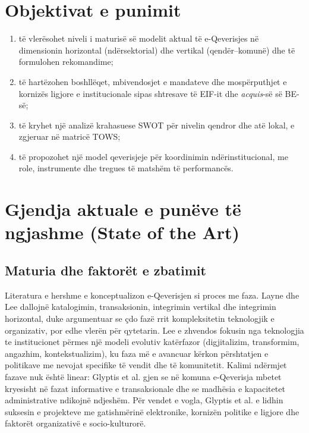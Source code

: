 \documentclass[conference]{IEEEtran}
\begin{document}
\section{Objektivat e punimit}
\label{sec:objektivat}
\begin{enumerate}
\renewcommand{\labelenumi}{O\arabic{enumi}:}
\item të vlerësohet niveli i maturisë së modelit aktual të e-Qeverisjes në
dimensionin horizontal (ndërsektorial) dhe vertikal (qendër--komunë) dhe të
formulohen rekomandime;
\item të hartëzohen boshllëqet, mbivendosjet e mandateve dhe mospërputhjet e
kornizës ligjore e institucionale sipas shtresave të EIF-it dhe
\textit{acquis}-së së BE-së;
\item të kryhet një analizë krahasuese SWOT për nivelin qendror dhe atë
lokal, e zgjeruar në matricë TOWS;
\item të propozohet një model qeverisjeje për koordinimin ndërinstitucional,
me role, instrumente dhe tregues të matshëm të performancës.
\end{enumerate}
\section{Gjendja aktuale e punëve të ngjashme (State of the Art)}
\label{sec:sota}
\subsection{Maturia dhe faktorët e zbatimit}
Literatura e hershme e konceptualizon e-Qeverisjen si proces me faza. Layne
dhe Lee \cite{layne2001} dallojnë katalogimin, transaksionin, integrimin
vertikal dhe integrimin horizontal, duke argumentuar se çdo fazë rrit
kompleksitetin teknologjik e organizativ, por edhe vlerën për qytetarin.
Lee e zhvendos fokusin nga teknologjia te
institucionet përmes një modeli evolutiv katërfazor (digjitalizim,
transformim, angazhim, kontekstualizim), ku faza më e avancuar kërkon
përshtatjen e politikave me nevojat specifike të vendit dhe të komunitetit.
Kalimi ndërmjet fazave nuk është linear: Glyptis et al. gjen se në
komuna e-Qeverisja mbetet kryesisht në fazat informative e transaksionale
dhe se madhësia e kapacitetet administrative ndikojnë ndjeshëm. Për vendet
e vogla, Glyptis et al. \cite{glyptis2020} e lidhin suksesin e projekteve me
gatishmërinë elektronike, kornizën politike e ligjore dhe faktorët
organizativë e socio-kulturorë.
\end{document}
